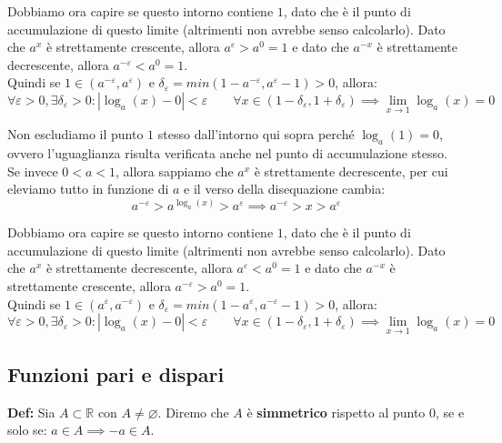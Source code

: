 \documentclass{article}
\begin{document}
\noindent Dobbiamo ora capire se questo intorno contiene $1$, dato che è il punto di accumulazione di questo limite (altrimenti non avrebbe senso calcolarlo). Dato che $a^x$ è strettamente crescente, allora $a^\varepsilon > a^0 = 1$ e dato che $a^{-x}$ è strettamente decrescente, allora $a^{-\varepsilon} < a^0 = 1$. \\
Quindi se $1 \in (a^{-\varepsilon}, a^\varepsilon)$ e $\delta_\varepsilon = min(1 - a^{-\varepsilon}, a^\varepsilon - 1) > 0$, allora:
\begin{equation*}
    \forall \varepsilon > 0, \exists \delta_\varepsilon > 0 : |\log_a(x) - 0| < \varepsilon \qquad \forall x \in (1 - \delta_\varepsilon, 1 + \delta_\varepsilon) \implies \lim_{x \to 1} \log_a(x) = 0
\end{equation*}

\noindent Non escludiamo il punto $1$ stesso dall'intorno qui sopra perché $\log_a(1) = 0$, ovvero l'uguaglianza risulta verificata anche nel punto di accumulazione stesso.\\

\noindent Se invece $0 < a < 1$, allora sappiamo che $a^x$ è strettamente decrescente, per cui eleviamo tutto in funzione di $a$ e il verso della disequazione cambia:
\begin{equation*}
    a^{-\varepsilon} > a^{\log_a(x)} > a^\varepsilon \implies a^{-\varepsilon} > x > a^\varepsilon
\end{equation*}

\noindent Dobbiamo ora capire se questo intorno contiene $1$, dato che è il punto di accumulazione di questo limite (altrimenti non avrebbe senso calcolarlo). Dato che $a^x$ è strettamente decrescente, allora $a^\varepsilon < a^0 = 1$ e dato che $a^{-x}$ è strettamente crescente, allora $a^{-\varepsilon} > a^0 = 1$. \\
Quindi se $1 \in (a^\varepsilon, a^{-\varepsilon})$ e $\delta_\varepsilon = min(1 - a^\varepsilon, a^{-\varepsilon} - 1) > 0$, allora:
\begin{equation*}
    \forall \varepsilon > 0, \exists \delta_\varepsilon > 0 : |\log_a(x) - 0| < \varepsilon \qquad \forall x \in (1 - \delta_\varepsilon, 1 + \delta_\varepsilon) \implies \lim_{x \to 1} \log_a(x) = 0
\end{equation*}

\subsection{Funzioni pari e dispari}
\noindent\textbf{Def:} Sia $A \subset \mathbb{R}$ con $A \neq \varnothing$. Diremo che $A$ è \textbf{simmetrico} rispetto al punto $0$, se e solo se: $a \in A \implies -a \in A$.\\
\end{document}
